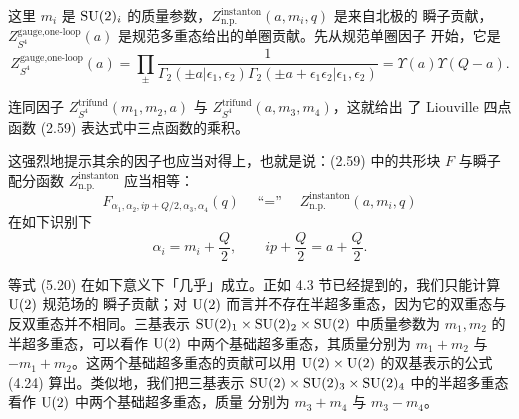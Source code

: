 
这里 $m_i$ 是 $\mathrm{SU}(2)_i$ 的质量参数，$Z^{\text{instanton}}_{\text{n.p.}}(a,m_i,q)$ 是来自北极的
瞬子贡献，$Z^{\text{gauge,one-loop}}_{S^4}(a)$ 是规范多重态给出的单圈贡献。先从规范单圈因子
开始，它是
\begin{equation}
Z^{\text{gauge,one-loop}}_{S^4}(a)=\prod_{\pm}\frac{1}{\Gamma_2(\pm a|\epsilon_1,\epsilon_2)
\Gamma_2(\pm a+\epsilon_1\epsilon_2|\epsilon_1,\epsilon_2)}=\Upsilon(a)\Upsilon(Q-a).
\tag{5.19}
\end{equation}


连同因子 $Z^{\text{trifund}}_{S^4}(m_1,m_2,a)$ 与 $Z^{\text{trifund}}_{S^4}(a,m_3,m_4)$，这就给出
了 Liouville 四点函数 (2.59) 表达式中三点函数的乘积。

这强烈地提示其余的因子也应当对得上，也就是说：(2.59) 中的共形块 $F$ 与瞬子配分函数
$Z^{\text{instanton}}_{\text{n.p.}}$ 应当相等：
\begin{equation}
F_{\alpha_1,\alpha_2,ip+Q/2,\alpha_3,\alpha_4}(q)\quad\text{``$=$''}\quad
Z^{\text{instanton}}_{\text{n.p.}}(a,m_i,q)
\tag{5.20}
\end{equation}
在如下识别下
\begin{equation}
\alpha_i=m_i+\frac{Q}{2},\qquad ip+\frac{Q}{2}=a+\frac{Q}{2}.
\tag{5.21}
\end{equation}

等式 (5.20) 在如下意义下「几乎」成立。正如 4.3 节已经提到的，我们只能计算 $\mathrm{U}(2)$ 规范场的
瞬子贡献；对 $\mathrm{U}(2)$ 而言并不存在半超多重态，因为它的双重态与反双重态并不相同。三基表示
$\mathrm{SU}(2)_1\times\mathrm{SU}(2)_2\times\mathrm{SU}(2)$ 中质量参数为 $m_1,m_2$ 的半超多重态，可以看作 $\mathrm{U}(2)$
中两个基础超多重态，其质量分别为 $m_1+m_2$ 与 $-m_1+m_2$。这两个基础超多重态的贡献可以用
$\mathrm{U}(2)\times\mathrm{U}(2)$ 的双基表示的公式 (4.24) 算出。类似地，我们把三基表示
$\mathrm{SU}(2)\times\mathrm{SU}(2)_3\times\mathrm{SU}(2)_4$ 中的半超多重态看作 $\mathrm{U}(2)$ 中两个基础超多重态，质量
分别为 $m_3+m_4$ 与 $m_3-m_4$。

